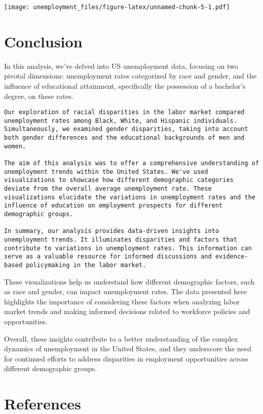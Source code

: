 \documentclass[
]{article}
\begin{document}
\texttt{[image: unemployment\_files/figure-latex/unnamed-chunk-5-1.pdf]}

\hypertarget{conclusion}{%
\section{Conclusion}\label{conclusion}}

In this analysis, we've delved into US unemployment data, focusing on
two pivotal dimensions: unemployment rates categorized by race and
gender, and the influence of educational attainment, specifically the
possession of a bachelor's degree, on these rates.

\begin{verbatim}
Our exploration of racial disparities in the labor market compared unemployment rates among Black, White, and Hispanic individuals. Simultaneously, we examined gender disparities, taking into account both gender differences and the educational backgrounds of men and women.

The aim of this analysis was to offer a comprehensive understanding of unemployment trends within the United States. We've used visualizations to showcase how different demographic categories deviate from the overall average unemployment rate. These visualizations elucidate the variations in unemployment rates and the influence of education on employment prospects for different demographic groups.

In summary, our analysis provides data-driven insights into unemployment trends. It illuminates disparities and factors that contribute to variations in unemployment rates. This information can serve as a valuable resource for informed discussions and evidence-based policymaking in the labor market.
\end{verbatim}

These visualizations help us understand how different demographic
factors, such as race and gender, can impact unemployment rates. The
data presented here highlights the importance of considering these
factors when analyzing labor market trends and making informed decisions
related to workforce policies and opportunities.

Overall, these insights contribute to a better understanding of the
complex dynamics of unemployment in the United States, and they
underscore the need for continued efforts to address disparities in
employment opportunities across different demographic groups.

\hypertarget{references}{%
\section{References}\label{references}}
\end{document}
